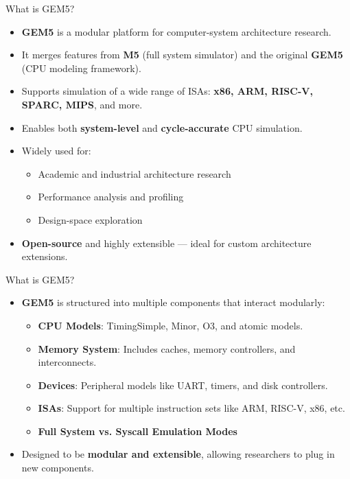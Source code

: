 \begin{frame}{What is GEM5?}
  \begin{itemize}
    \item \textbf{GEM5} is a modular platform for computer-system architecture research.
    \item It merges features from \textbf{M5} (full system simulator) and the original \textbf{GEM5} (CPU modeling framework).
    \item Supports simulation of a wide range of ISAs: \textbf{x86, ARM, RISC-V, SPARC, MIPS}, and more.
    \item Enables both \textbf{system-level} and \textbf{cycle-accurate} CPU simulation.
    \item Widely used for:
      \begin{itemize}
        \item Academic and industrial architecture research
        \item Performance analysis and profiling
        \item Design-space exploration
      \end{itemize}
    \item \textbf{Open-source} and highly extensible — ideal for custom architecture extensions.
  \end{itemize}
\end{frame}


\begin{frame}{What is GEM5?}
  \begin{itemize}
    \item \textbf{GEM5} is structured into multiple components that interact modularly:
    \begin{itemize}
      \item \textbf{CPU Models}: TimingSimple, Minor, O3, and atomic models.
      \item \textbf{Memory System}: Includes caches, memory controllers, and interconnects.
      \item \textbf{Devices}: Peripheral models like UART, timers, and disk controllers.
      \item \textbf{ISAs}: Support for multiple instruction sets like ARM, RISC-V, x86, etc.
      \item \textbf{Full System vs. Syscall Emulation Modes}
    \end{itemize}
    \item Designed to be \textbf{modular and extensible}, allowing researchers to plug in new components.
  \end{itemize}
\end{frame}

